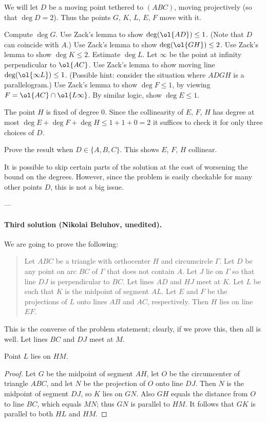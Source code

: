 We will let $D$ be a moving point tethered to $(ABC)$,
moving projectively (so that $\deg D = 2$).
Thus the points $G$, $K$, $L$, $E$, $F$ move with it.
\begin{walk}
  \ii Compute $\deg G$.
  \ii Use Zack's lemma to show $\deg(\ol{AD}) \le 1$.
  (Note that $D$ can coincide with $A$.)
  \ii Use Zack's lemma to show $\deg(\ol{GH}) \le 2$.
  \ii Use Zack's lemma to show $\deg K \le 2$.
  \ii Estimate $\deg L$.
  \ii Let $\infty$ be the point at infinity perpendicular to $\ol{AC}$.
  Use Zack's lemma to show moving line $\deg(\ol{\infty L}) \le 1$.
  (Possible hint:
  consider the situation where $ADGH$ is a parallelogram.)
  \ii Use Zack's lemma to show $\deg F \le 1$,
  by viewing $F = \ol{AC} \cap \ol{L\infty}$.
  \ii By similar logic, show $\deg E \le 1$.
\end{walk}
The point $H$ is fixed of degree $0$.
Since the collinearity of $E$, $F$, $H$ has
degree at most $\deg E + \deg F + \deg H \le 1 + 1 + 0 = 2$
it suffices to check it for only three choices of $D$.

\begin{walk}[resume]
  \ii Prove the result when $D \in \{A, B, C\}$.
  This shows $E$, $F$, $H$ collinear.
\end{walk}
It is possible to skip certain parts of the solution
at the cost of worsening the bound on the degrees.
However, since the problem is easily checkable
for many other points $D$,
this is not a big issue.

---

\paragraph{Third solution (Nikolai Beluhov, unedited).}
We are going to prove the following:
\begin{quote}
Let $ABC$ be a triangle with orthocenter $H$ and circumcircle $\Gamma$. Let $D$ be any point on arc $BC$ of $\Gamma$ that does not contain $A$.
Let $J$ lie on $\Gamma$ so that line $DJ$ is perpendicular to $BC$. Let lines $AD$ and $HJ$ meet at $K$.
Let $L$ be such that $K$ is the midpoint of segment $AL$. Let $E$ and $F$ be the projections of $L$ onto lines $AB$ and $AC$, respectively. Then $H$ lies on line $EF$.
\end{quote}
This is the converse of the problem statement; clearly, if we prove this, then all is well.
Let lines $BC$ and $DJ$ meet at $M$.
\begin{claim*}
  Point $L$ lies on $HM$.
\end{claim*}
\begin{proof}
Let $G$ be the midpoint of segment $AH$, let $O$ be the circumcenter of triangle $ABC$, and let $N$ be the projection of $O$ onto line $DJ$.
Then $N$ is the midpoint of segment $DJ$, so $K$ lies on $GN$. Also $GH$ equals the distance from $O$ to line $BC$, which equals $MN$; thus $GN$ is parallel to $HM$.
It follows that $GK$ is parallel to both $HL$ and $HM$.
\end{proof}

